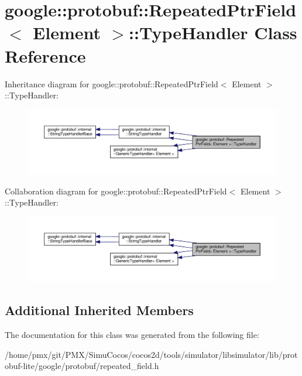 \hypertarget{classgoogle_1_1protobuf_1_1RepeatedPtrField_1_1TypeHandler}{}\section{google\+:\+:protobuf\+:\+:Repeated\+Ptr\+Field$<$ Element $>$\+:\+:Type\+Handler Class Reference}
\label{classgoogle_1_1protobuf_1_1RepeatedPtrField_1_1TypeHandler}


Inheritance diagram for google\+:\+:protobuf\+:\+:Repeated\+Ptr\+Field$<$ Element $>$\+:\+:Type\+Handler\+:
\nopagebreak
\begin{figure}[H]
\begin{center}
\leavevmode
\includegraphics[width=350pt]{classgoogle_1_1protobuf_1_1RepeatedPtrField_1_1TypeHandler__inherit__graph}
\end{center}
\end{figure}


Collaboration diagram for google\+:\+:protobuf\+:\+:Repeated\+Ptr\+Field$<$ Element $>$\+:\+:Type\+Handler\+:
\nopagebreak
\begin{figure}[H]
\begin{center}
\leavevmode
\includegraphics[width=350pt]{classgoogle_1_1protobuf_1_1RepeatedPtrField_1_1TypeHandler__coll__graph}
\end{center}
\end{figure}
\subsection*{Additional Inherited Members}


The documentation for this class was generated from the following file\+:\begin{DoxyCompactItemize}
\item 
/home/pmx/git/\+P\+M\+X/\+Simu\+Cocos/cocos2d/tools/simulator/libsimulator/lib/protobuf-\/lite/google/protobuf/repeated\+\_\+field.\+h\end{DoxyCompactItemize}

